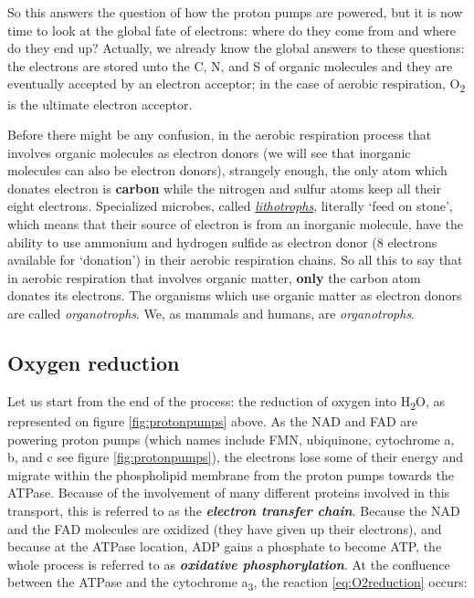 \documentclass[]{book}
\theoremstyle{definition}
\theoremstyle{definition}
\theoremstyle{definition}
\theoremstyle{remark}
\begin{document}
So this answers the question of how the proton pumps are powered, but it
is now time to look at the global fate of electrons: where do they come
from and where do they end up? Actually, we already know the global
answers to these questions: the electrons are stored unto the C, N, and
S of organic molecules and they are eventually accepted by an electron
acceptor; in the case of aerobic respiration, O\textsubscript{2} is the
ultimate electron acceptor.

Before there might be any confusion, in the aerobic respiration process
that involves organic molecules as electron donors (we will see that
inorganic molecules can also be electron donors), strangely enough, the
only atom which donates electron is \textbf{carbon} while the nitrogen
and sulfur atoms keep all their eight electrons. Specialized microbes,
called \emph{\protect\hyperlink{lithotrophs}{lithotrophs}}, literally
`feed on stone', which means that their source of electron is from an
inorganic molecule, have the ability to use ammonium and hydrogen
sulfide as electron donor (8 electrons available for `donation') in
their aerobic respiration chains. So all this to say that in aerobic
respiration that involves organic matter, \textbf{only} the carbon atom
donates its electrons. The organisms which use organic matter as
electron donors are called \emph{organotrophs}. We, as mammals and
humans, are \emph{organotrophs}.

\subsection{Oxygen reduction}\label{oxygen-reduction}

Let us start from the end of the process: the reduction of oxygen into
H\textsubscript{2}O, as represented on figure \ref{fig:protonpumps}
above. As the NAD and FAD are powering proton pumps (which names include
FMN, ubiquinone, cytochrome a, b, and c see figure
\ref{fig:protonpumps}), the electrons lose some of their energy and
migrate within the phospholipid membrane from the proton pumps towards
the ATPase. Because of the involvement of many different proteins
involved in this transport, this is referred to as the
\emph{\textbf{electron transfer chain}}. Because the NAD and the FAD
molecules are oxidized (they have given up their electrons), and because
at the ATPase location, ADP gains a phosphate to become ATP, the whole
process is referred to as \emph{\textbf{oxidative phosphorylation}}. At
the confluence between the ATPase and the cytochrome a\textsubscript{3},
the reaction \eqref{eq:O2reduction} occurs:
\end{document}
